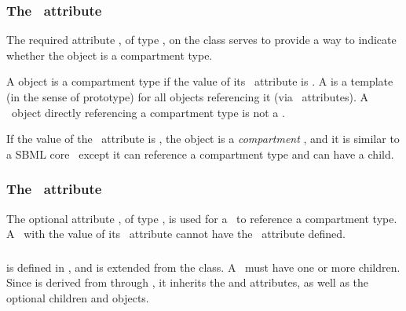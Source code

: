 \subsubsection{The \isTypeAtt\ attribute}
\label{def:Compartment:isType}

The required attribute \isTypeAtt, of type \booleanPT, on the  class serves to provide a way to indicate whether the  object is a compartment type. 

A  object is a compartment type if the value of its \isTypeAtt\ attribute is . A  is a template (in the sense of prototype) for all  objects referencing it (via  \compartmentTypeAtt\ attributes). A \ExSpecies\ object directly referencing a compartment type is not a \fullydefinedspeciesWC. 

If the value of the \isTypeAtt\ attribute is ,\label{def:Compartment:isType:false} the  object is a  \textit{compartment} , and it is similar to a SBML core \compartment\ except it can reference a compartment type and can have a \ListOfCompartmentReferences child.

\subsubsection{The \compartmentTypeAtt\ attribute}
\label{def:Compartment:compartmentType}

The optional attribute \compartmentTypeAtt, of type \SIdRefPT, is used for a  \compartment\ to reference a compartment type. A \compartment\ with the  value of its \isTypeAtt\ attribute cannot have the \compartmentTypeAtt\ attribute defined.

\subsubsection{}
\label{def:ListOfCompartmentReferences}

 is defined in , and is extended from the  class. A \listOfCompartmentReferences\ must have one or more \CompartmentReference children.  Since  is derived from  through , it inherits the  and  attributes, as well as the optional children  and  objects. 

